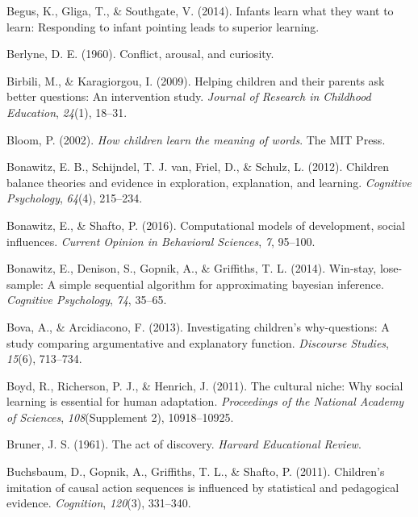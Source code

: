 \documentclass[english,man]{apa6}
\theoremstyle{definition}
\theoremstyle{definition}
\theoremstyle{definition}
\theoremstyle{remark}
\begin{document}
\hypertarget{ref-begus2014infants}{}
Begus, K., Gliga, T., \& Southgate, V. (2014). Infants learn what they
want to learn: Responding to infant pointing leads to superior learning.

\hypertarget{ref-berlyne1960conflict}{}
Berlyne, D. E. (1960). Conflict, arousal, and curiosity.

\hypertarget{ref-birbili2009helping}{}
Birbili, M., \& Karagiorgou, I. (2009). Helping children and their
parents ask better questions: An intervention study. \emph{Journal of
Research in Childhood Education}, \emph{24}(1), 18--31.

\hypertarget{ref-bloom2002children}{}
Bloom, P. (2002). \emph{How children learn the meaning of words}. The
MIT Press.

\hypertarget{ref-bonawitz2012children}{}
Bonawitz, E. B., Schijndel, T. J. van, Friel, D., \& Schulz, L. (2012).
Children balance theories and evidence in exploration, explanation, and
learning. \emph{Cognitive Psychology}, \emph{64}(4), 215--234.

\hypertarget{ref-bonawitz2016computational}{}
Bonawitz, E., \& Shafto, P. (2016). Computational models of development,
social influences. \emph{Current Opinion in Behavioral Sciences},
\emph{7}, 95--100.

\hypertarget{ref-bonawitz2014win}{}
Bonawitz, E., Denison, S., Gopnik, A., \& Griffiths, T. L. (2014).
Win-stay, lose-sample: A simple sequential algorithm for approximating
bayesian inference. \emph{Cognitive Psychology}, \emph{74}, 35--65.

\hypertarget{ref-bova2013investigating}{}
Bova, A., \& Arcidiacono, F. (2013). Investigating children's
why-questions: A study comparing argumentative and explanatory function.
\emph{Discourse Studies}, \emph{15}(6), 713--734.

\hypertarget{ref-boyd2011cultural}{}
Boyd, R., Richerson, P. J., \& Henrich, J. (2011). The cultural niche:
Why social learning is essential for human adaptation. \emph{Proceedings
of the National Academy of Sciences}, \emph{108}(Supplement 2),
10918--10925.

\hypertarget{ref-bruner1961act}{}
Bruner, J. S. (1961). The act of discovery. \emph{Harvard Educational
Review}.

\hypertarget{ref-buchsbaum2011children}{}
Buchsbaum, D., Gopnik, A., Griffiths, T. L., \& Shafto, P. (2011).
Children's imitation of causal action sequences is influenced by
statistical and pedagogical evidence. \emph{Cognition}, \emph{120}(3),
331--340.
\end{document}
